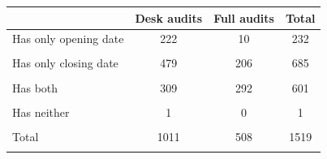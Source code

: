 \begin{tabular}{l*{3}{c}}
\toprule
            & Desk audits& Full audits&       Total\\
\midrule
Has only opening date&         222&          10&         232\\
            &            &            &            \\
\addlinespace
Has only closing date&         479&         206&         685\\
            &            &            &            \\
\addlinespace
Has both    &         309&         292&         601\\
            &            &            &            \\
\addlinespace
Has neither &           1&           0&           1\\
            &            &            &            \\
\addlinespace
Total       &        1011&         508&        1519\\
            &            &            &            \\
\bottomrule
\end{tabular}
